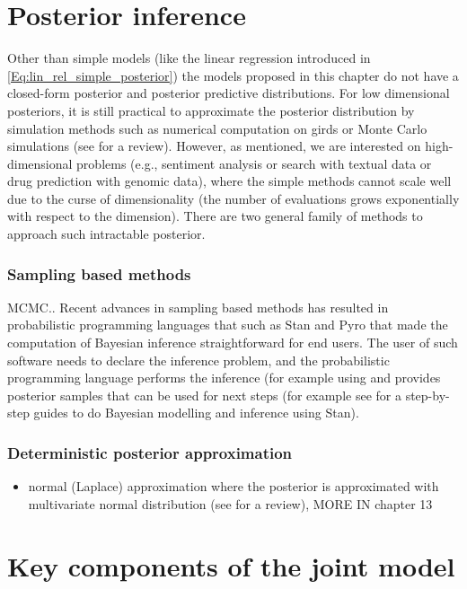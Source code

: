 \documentclass[dissertation,math,vertlayout,pdfa,colorlinks]{aaltoseries}
\begin{document}
\section{Posterior inference} \label{posteriro_inf}
Other than simple models (like the linear regression introduced in \ref{Eq:lin_rel_simple_posterior}) the models proposed in this chapter do not have a closed-form posterior and posterior predictive distributions. For low dimensional posteriors, it is still practical to approximate the posterior distribution by simulation methods such as numerical computation on girds or Monte Carlo simulations (see \cite[Chapter~10]{Gelman2013} for a review). However, as mentioned, we are interested on high-dimensional problems (e.g., sentiment analysis or search with textual data or drug prediction with genomic data), where the simple methods cannot scale well due to the curse of dimensionality (the number of evaluations grows exponentially with respect to the dimension). There are two general family of methods to approach such intractable posterior.

\subsubsection{Sampling based methods}

MCMC.. 
Recent advances in sampling based methods has resulted in probabilistic programming languages that such as Stan \cite{STAN} and Pyro \cite{bingham2018pyro} that made the computation of Bayesian inference straightforward for end users. The user of such software needs to declare the inference problem, and the probabilistic programming language performs the inference (for example using and provides posterior samples that can be used for next steps (for example see \cite{Bayesian_workflow_cog_sci_2019} for a step-by-step guides to do Bayesian modelling and inference using Stan).

\subsubsection{Deterministic posterior approximation}

\begin{itemize}
	\item normal (Laplace) approximation where the posterior is approximated with multivariate normal distribution (see \cite[Chapter~4]{Gelman2013} for a review), MORE IN chapter 13
\end{itemize}

\section{Key components of the joint model}\label{key_comp}
\end{document}
